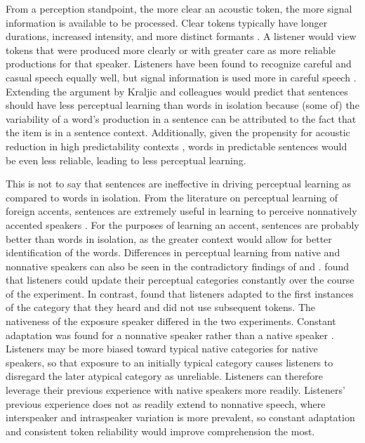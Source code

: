 From a perception standpoint, the more clear an acoustic token, the more signal information is available to be processed.
Clear tokens typically have longer durations, increased intensity, and more distinct formants \citep{Krause2004}.
A listener would view tokens that were produced more clearly or with greater care as more reliable productions for that speaker.
Listeners have been found to recognize careful and casual speech equally well, but signal information is used more in careful speech \citep{Sumner2015}.
Extending the argument by Kraljic and colleagues would predict that sentences should have less perceptual learning than words in isolation because (some of) the variability of a word's production in a sentence can be attributed to the fact that the item is in a sentence context.
Additionally, given the propensity for acoustic reduction in high predictability contexts \citep{Scarborough2010}, words in predictable sentences would be even less reliable, leading to less perceptual learning.

This is not to say that sentences are ineffective in driving perceptual learning as compared to words in isolation.
From the literature on perceptual learning of foreign accents, sentences are extremely useful in learning to perceive nonnatively accented speakers \citep{Bradlow2008}.
For the purposes of learning an accent, sentences are probably better than words in isolation, as the greater context would allow for better identification of the words.
Differences in perceptual learning from native and nonnative speakers can also be seen in the contradictory findings of \citet{Sumner2011} and \citet{Kraljic2008}.
\citet{Sumner2011} found that listeners could update their perceptual categories constantly over the course of the experiment.
In contrast, \citet{Kraljic2008} found that listeners adapted to the first instances of the category that they heard and did not use subsequent tokens.
The nativeness of the exposure speaker differed in the two experiments.
Constant adaptation was found for a nonnative speaker \citep{Sumner2011} rather than a native speaker \citep{Kraljic2008}.
Listeners may be more biased toward typical native categories for native speakers, so that exposure to an initially typical category causes listeners to disregard the later atypical category as unreliable.
Listeners can therefore leverage their previous experience with native speakers more readily.
Listeners' previous experience does not as readily extend to nonnative speech, where interspeaker and intraspeaker variation is more prevalent, so constant adaptation and consistent token reliability would improve comprehension the most.

